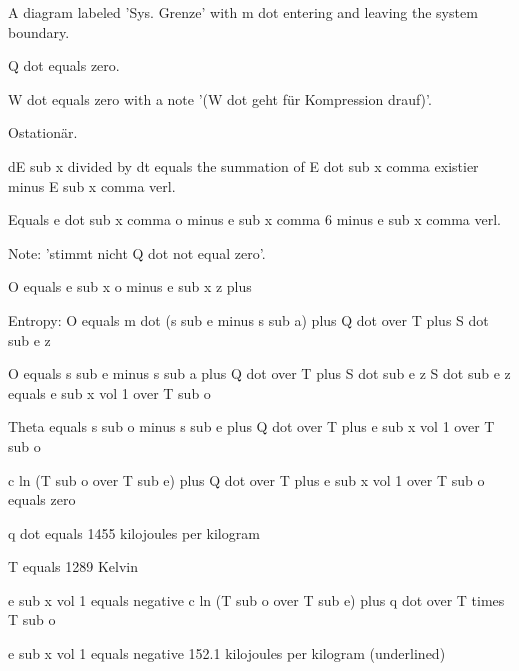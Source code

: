 A diagram labeled 'Sys. Grenze' with m dot entering and leaving the system boundary.

Q dot equals zero.

W dot equals zero with a note '(W dot geht für Kompression drauf)'.

Ostationär.

dE sub x divided by dt equals the summation of E dot sub x comma existier minus E sub x comma verl.

Equals e dot sub x comma o minus e sub x comma 6 minus e sub x comma verl.

Note: 'stimmt nicht Q dot not equal zero'.

O equals e sub x o minus e sub x z plus

Entropy: O equals m dot (s sub e minus s sub a) plus Q dot over T plus S dot sub e z

O equals s sub e minus s sub a plus Q dot over T plus S dot sub e z
S dot sub e z equals e sub x vol 1 over T sub o

Theta equals s sub o minus s sub e plus Q dot over T plus e sub x vol 1 over T sub o

c ln (T sub o over T sub e) plus Q dot over T plus e sub x vol 1 over T sub o equals zero

q dot equals 1455 kilojoules per kilogram

T equals 1289 Kelvin

e sub x vol 1 equals negative c ln (T sub o over T sub e) plus q dot over T times T sub o

e sub x vol 1 equals negative 152.1 kilojoules per kilogram (underlined)
